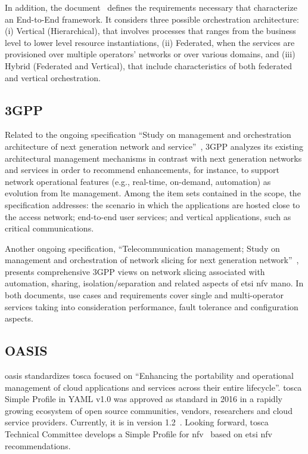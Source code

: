 In addition, the document~\cite{NGMNAlliance2018} defines the requirements necessary that characterize an End-to-End framework. It considers three possible orchestration architecture: (i) Vertical (Hierarchical), that involves processes that ranges from the business level to lower level resource instantiations, (ii) Federated, when the services are provisioned over multiple operators’ networks or over various domains, and (iii) Hybrid (Federated and Vertical), that include characteristics of both federated and vertical orchestration.  


\subsection{3GPP}
Related to the ongoing specification ``Study on management and orchestration architecture of next generation network and service''~\cite{3gppStudy:28800:2017}, 3GPP analyzes its existing architectural management mechanisms in contrast with next generation networks and services in order to recommend enhancements, for instance, to support network operational features (e.g., real-time, on-demand, automation) as evolution from \gls{lte} management. Among the item sets contained in the scope, the specification addresses: the scenario in which the applications are hosted close to the access network; end-to-end user services; and vertical applications, such as critical communications. 

Another ongoing specification, ``Telecommunication management; Study on management and orchestration of network slicing for next generation network''~\cite{3GPP2017TRNetwork}, presents comprehensive 3GPP views on network slicing associated with automation, sharing, isolation/separation and related aspects of \gls{etsi} \gls{nfv} \gls{mano}. In both documents, use cases and requirements cover single and multi-operator services taking into consideration performance, fault tolerance and configuration aspects.

\subsection{OASIS}
\gls{oasis} standardizes \gls{tosca} focused on ``Enhancing the portability and operational management of cloud applications and services across their entire lifecycle''. \gls{tosca} Simple Profile in YAML v1.0 was approved as standard in 2016 in a rapidly growing ecosystem of open source communities, vendors, researchers and cloud service providers. Currently, it is in version 1.2~\cite{OASIS2017TOSCA1.2}. Looking forward, \gls{tosca} Technical Committee develops a Simple Profile for \gls{nfv}~\cite{OASIS2017TOSCA1.0} based on \gls{etsi} \gls{nfv} recommendations. 

